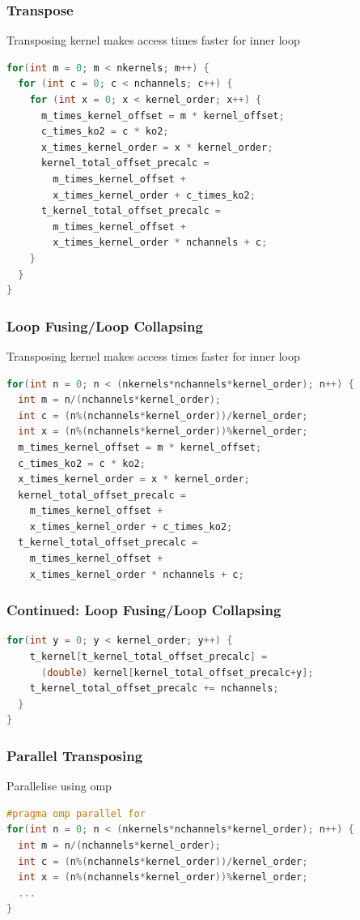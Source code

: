 \documentclass{beamer}
\begin{document}
\begin{frame}[fragile]
\frametitle{Transpose}
Transposing kernel makes access times faster for inner loop
\begin{lstlisting}[language=C,keywordstyle=\color{blue}]
for(int m = 0; m < nkernels; m++) {
  for (int c = 0; c < nchannels; c++) {
    for (int x = 0; x < kernel_order; x++) {
      m_times_kernel_offset = m * kernel_offset;
      c_times_ko2 = c * ko2;
      x_times_kernel_order = x * kernel_order;
      kernel_total_offset_precalc = 
        m_times_kernel_offset + 
        x_times_kernel_order + c_times_ko2;
      t_kernel_total_offset_precalc = 
        m_times_kernel_offset + 
        x_times_kernel_order * nchannels + c;
    }
  } 
}
\end{lstlisting}
\end{frame}

\begin{frame}[fragile]
\frametitle{Loop Fusing/Loop Collapsing}
Transposing kernel makes access times faster for inner loop
\begin{lstlisting}[language=C,keywordstyle=\color{blue}]
for(int n = 0; n < (nkernels*nchannels*kernel_order); n++) {
  int m = n/(nchannels*kernel_order);
  int c = (n%(nchannels*kernel_order))/kernel_order; 
  int x = (n%(nchannels*kernel_order))%kernel_order; 
  m_times_kernel_offset = m * kernel_offset;
  c_times_ko2 = c * ko2;
  x_times_kernel_order = x * kernel_order;
  kernel_total_offset_precalc = 
    m_times_kernel_offset + 
    x_times_kernel_order + c_times_ko2;
  t_kernel_total_offset_precalc = 
    m_times_kernel_offset + 
    x_times_kernel_order * nchannels + c;
\end{lstlisting}
\end{frame}

\begin{frame}[fragile]
\frametitle{Continued: Loop Fusing/Loop Collapsing }
\begin{lstlisting}[language=C,keywordstyle=\color{blue}]
  for(int y = 0; y < kernel_order; y++) {
    t_kernel[t_kernel_total_offset_precalc] = 
      (double) kernel[kernel_total_offset_precalc+y];
    t_kernel_total_offset_precalc += nchannels;
  }
}
\end{lstlisting}
\end{frame}

\begin{frame}[fragile]
\frametitle{Parallel Transposing}
Parallelise using omp
\begin{lstlisting}[language=C,keywordstyle=\color{blue}]
#pragma omp parallel for
for(int n = 0; n < (nkernels*nchannels*kernel_order); n++) {
  int m = n/(nchannels*kernel_order);
  int c = (n%(nchannels*kernel_order))/kernel_order; 
  int x = (n%(nchannels*kernel_order))%kernel_order; 
  ...
}
\end{lstlisting}
\end{frame}
\end{document}
